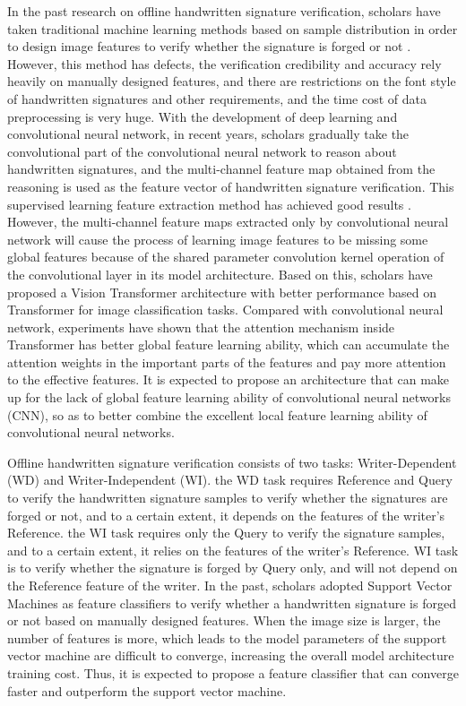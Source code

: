 \documentclass{article}
\begin{document}
In the past research on offline handwritten signature verification, scholars have taken traditional machine learning methods based on sample distribution in order to design image features to verify whether the signature is forged or not \cite{1}. However, this method has defects, the verification credibility and accuracy rely heavily on manually designed features, and there are restrictions on the font style of handwritten signatures and other requirements, and the time cost of data preprocessing is very huge. With the development of deep learning and convolutional neural network, in recent years, scholars gradually take the convolutional part of the convolutional neural network to reason about handwritten signatures, and the multi-channel feature map obtained from the reasoning is used as the feature vector of handwritten signature verification. This supervised learning feature extraction method has achieved good results \cite{2}. However, the multi-channel feature maps extracted only by convolutional neural network will cause the process of learning image features to be missing some global features because of the shared parameter convolution kernel operation of the convolutional layer in its model architecture. Based on this, scholars have proposed a Vision Transformer architecture \cite{10} with better performance based on Transformer \cite{9} for image classification tasks. Compared with convolutional neural network, experiments have shown that the attention mechanism inside Transformer has better global feature learning ability, which can accumulate the attention weights in the important parts of the features and pay more attention to the effective features. It is expected to propose an architecture that can make up for the lack of global feature learning ability of convolutional neural networks (CNN), so as to better combine the excellent local feature learning ability of convolutional neural networks.

Offline handwritten signature verification consists of two tasks: Writer-Dependent (WD) and Writer-Independent (WI). the WD task requires Reference and Query to verify the handwritten signature samples to verify whether the signatures are forged or not, and to a certain extent, it depends on the features of the writer's Reference. the WI task requires only the Query to verify the signature samples, and to a certain extent, it relies on the features of the writer's Reference. WI task is to verify whether the signature is forged by Query only, and will not depend on the Reference feature of the writer. In the past, scholars adopted Support Vector Machines as feature classifiers to verify whether a handwritten signature is forged or not based on manually designed features. When the image size is larger, the number of features is more, which leads to the model parameters of the support vector machine are difficult to converge, increasing the overall model architecture training cost. Thus, it is expected to propose a feature classifier that can converge faster and outperform the support vector machine.
\end{document}
